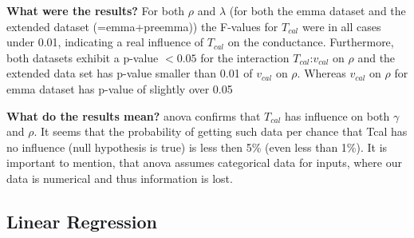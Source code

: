 \textbf{What were the results?}
For both $\rho$ and $\lambda$ (for both the \gls{emma} dataset and the extended dataset (=\gls{emma}+pre\gls{emma})) 
the F-values for $T_{cal}$ were in all cases under 0.01, 
indicating a real influence of $T_{cal}$ on the conductance.
Furthermore, both datasets exhibit a p-value $< 0.05$ for the interaction $T_{cal}$:$v_{cal}$ on $\rho$
and the extended data set has p-value smaller than 0.01 of $v_{cal}$ on $\rho$. 
Whereas $v_{cal}$ on $\rho$ for \gls{emma} dataset has p-value of slightly over 0.05

\textbf{What do the results mean?} 
\Gls{anova} confirms that $T_{cal}$ has influence on both $\gamma$ and $\rho$. 
It seems that the probability of getting such data per chance that Tcal has no influence 
(null hypothesis is true) is less then 5\% (even less than 1\%). 
It is important to mention, that \gls{anova} assumes categorical data for inputs, 
where our data is numerical and thus information is lost. 


\subsection{Linear Regression} 


